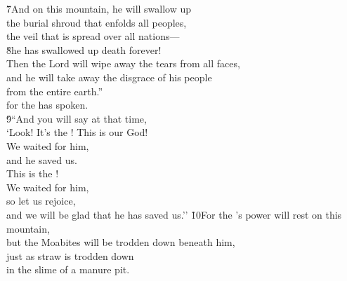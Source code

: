 \begin{poetry}
\poeml \v{7}And on this mountain, he will swallow up \\
\poemll    the burial shroud that enfolds all peoples, \\
\poeml the veil that is spread over all nations--- \\
\poeml \v{8}he has swallowed up death forever! \\
\poeml Then the Lord  will wipe away the tears from all faces, \\
\poemll    and he will take away the disgrace of his people \\
\poemlll       from the entire earth.'' \\
\poeml for the  has spoken. \\
\poeml \v{9}``And you will say at that time, \\
\poemll    `Look! It's the ! This is our God! \\
\poeml We waited for him, \\
\poemll    and he saved us. \\
\poeml This is the ! \\
\poemll    We waited for him, \\
\poeml so let us rejoice, \\
\poemll    and we will be glad that he has saved us.''
\poeml \v{10}For the 's power will rest on this mountain, \\
\poemll    but the Moabites will be trodden down beneath him, \\
\poeml just as straw is trodden down \\
\poemll    in the slime of a manure pit. \\

\end{poetry}
